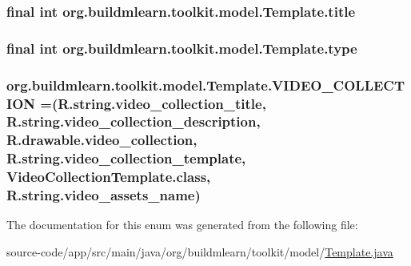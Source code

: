 \subsubsection[{\texorpdfstring{title}{title}}]{\setlength{\rightskip}{0pt plus 5cm}final int org.\+buildmlearn.\+toolkit.\+model.\+Template.\+title\hspace{0.3cm}{\ttfamily [private]}}\hypertarget{enumorg_1_1buildmlearn_1_1toolkit_1_1model_1_1Template_a112206e1cf6d9b50a0def584ee53529a}{}\label{enumorg_1_1buildmlearn_1_1toolkit_1_1model_1_1Template_a112206e1cf6d9b50a0def584ee53529a}
\subsubsection[{\texorpdfstring{type}{type}}]{\setlength{\rightskip}{0pt plus 5cm}final int org.\+buildmlearn.\+toolkit.\+model.\+Template.\+type}\hypertarget{enumorg_1_1buildmlearn_1_1toolkit_1_1model_1_1Template_a1ac0921d037d111c6d9a98c659b6de74}{}\label{enumorg_1_1buildmlearn_1_1toolkit_1_1model_1_1Template_a1ac0921d037d111c6d9a98c659b6de74}
\subsubsection[{\texorpdfstring{V\+I\+D\+E\+O\+\_\+\+C\+O\+L\+L\+E\+C\+T\+I\+ON}{VIDEO_COLLECTION}}]{\setlength{\rightskip}{0pt plus 5cm}org.\+buildmlearn.\+toolkit.\+model.\+Template.\+V\+I\+D\+E\+O\+\_\+\+C\+O\+L\+L\+E\+C\+T\+I\+ON =(R.\+string.\+video\+\_\+collection\+\_\+title, R.\+string.\+video\+\_\+collection\+\_\+description, R.\+drawable.\+video\+\_\+collection, R.\+string.\+video\+\_\+collection\+\_\+template, Video\+Collection\+Template.\+class, R.\+string.\+video\+\_\+assets\+\_\+name)}\hypertarget{enumorg_1_1buildmlearn_1_1toolkit_1_1model_1_1Template_a0b4b1d2ede6cce85075ed131f22f1743}{}\label{enumorg_1_1buildmlearn_1_1toolkit_1_1model_1_1Template_a0b4b1d2ede6cce85075ed131f22f1743}


The documentation for this enum was generated from the following file\+:\begin{DoxyCompactItemize}
\item 
source-\/code/app/src/main/java/org/buildmlearn/toolkit/model/\hyperlink{Template_8java}{Template.\+java}\end{DoxyCompactItemize}
